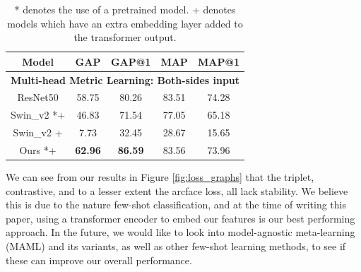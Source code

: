 \documentclass[10pt,twocolumn,letterpaper]{article}
\begin{document}

\begin{table}[h]
    \caption{* denotes the use of a pretrained model.  + denotes models which have an extra embedding layer added to the transformer output.}

    \begin{tabular}{|ccccc|}
    \hline
    \multicolumn{1}{|c|}{Model}       & \multicolumn{1}{c|}{GAP}   & \multicolumn{1}{c|}{GAP@1} & \multicolumn{1}{c|}{MAP}   & MAP@1 \\ \hline
    \multicolumn{5}{|c|}{\textbf{Multi-head Metric Learning: Both-sides input}}                                                      \\ \hline
    \multicolumn{1}{|c|}{ResNet50}    & \multicolumn{1}{c|}{58.75} & \multicolumn{1}{c|}{80.26} & \multicolumn{1}{c|}{83.51} & 74.28 \\ \hline
    \multicolumn{1}{|c|}{Swin\_v2 *+} & \multicolumn{1}{c|}{46.83} & \multicolumn{1}{c|}{71.54} & \multicolumn{1}{c|}{77.05} & 65.18 \\ \hline
    \multicolumn{1}{|c|}{Swin\_v2 +}  & \multicolumn{1}{c|}{7.73}  & \multicolumn{1}{c|}{32.45} & \multicolumn{1}{c|}{28.67} & 15.65 \\ \hline
    \multicolumn{1}{|c|}{Ours *+}   & \multicolumn{1}{c|}{\textbf{62.96}} & \multicolumn{1}{c|}{\textbf{86.59}} & \multicolumn{1}{c|}{83.56} & 73.96 \\ \hline
    \end{tabular}
    \label{tab:results}
\end{table}
We can see from our results in Figure \ref{fig:loss_graphs} that the triplet, contrastive, and to a lesser extent the arcface loss, all lack stability. 
We believe this is due to the nature few-shot classification, and at the time of writing this paper, using a transformer encoder to embed our features
is our best performing approach. In the future, we would like to look into model-agnostic meta-learning (MAML) \cite{maml} and its variants, as well as 
other few-shot learning methods, to see if these can improve our overall performance.
\end{document}
